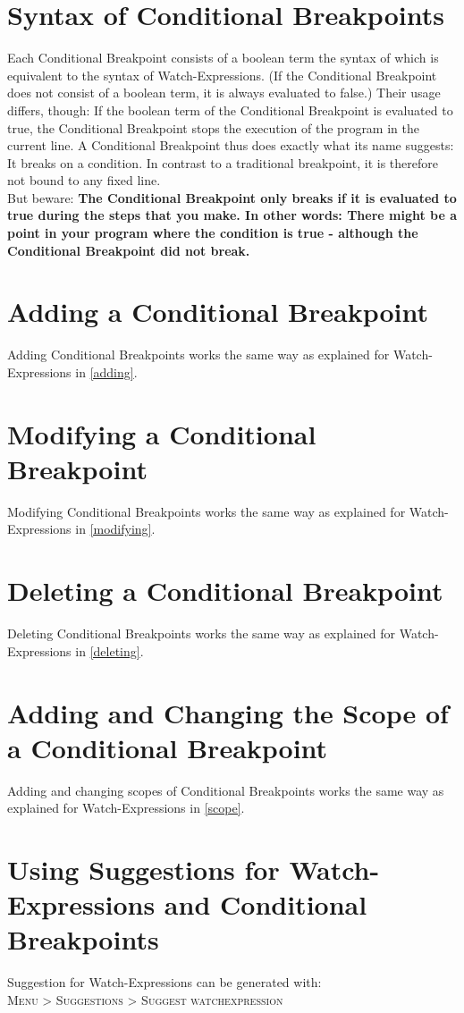 \documentclass[parskip=full]{memoir}
\begin{document}
\section{Syntax of Conditional Breakpoints}
Each Conditional Breakpoint consists of a boolean term the syntax of which is equivalent to the syntax of Watch-Expressions. (If the Conditional Breakpoint does not consist of a boolean term, it is always evaluated to false.) Their usage differs, though: If the boolean term of the Conditional Breakpoint is evaluated to true, the Conditional Breakpoint stops the execution of the program in the current line. A Conditional Breakpoint thus does exactly what its name suggests: It breaks on a condition. In contrast to a traditional breakpoint, it is therefore not bound to any fixed line. \\
But beware: \textbf{The Conditional Breakpoint only breaks if it is evaluated to true during the steps that you make. In other words: There might be a point in your program where the condition is true - although the Conditional Breakpoint did not break.}

\section{Adding a Conditional Breakpoint}
Adding Conditional Breakpoints works the same way as explained for Watch-Expressions in \ref{adding}.
\section{Modifying a Conditional Breakpoint}
Modifying Conditional Breakpoints works the same way as explained for Watch-Expressions in \ref{modifying}.
\section{Deleting a Conditional Breakpoint}
Deleting Conditional Breakpoints works the same way as explained for Watch-Expressions in \ref{deleting}.
\section{Adding and Changing the Scope of a Conditional Breakpoint}
Adding and changing scopes of Conditional Breakpoints works the same way as explained for Watch-Expressions in \ref{scope}.

\section{Using Suggestions for Watch-Expressions and Conditional Breakpoints}
Suggestion for Watch-Expressions can be generated with:\\
\textsc{Menu > Suggestions > Suggest watchexpression}\\
\end{document}
